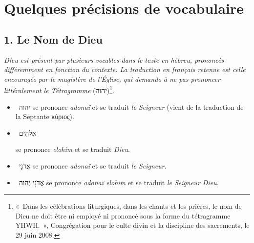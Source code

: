 \section*{Quelques précisions de vocabulaire}

\subsection*{1. Le Nom de Dieu}
\textit{Dieu est présent par plusieurs vocables dans le texte en hébreu, prononcés différemment en fonction du contexte. La traduction en français retenue est celle encouragée par le magistère de l'Église, qui demande à ne pas prononcer littéralement le Tétragramme} (\texthebrew{יהוה})\footnote{«~Dans les célébrations liturgiques, dans les chants et les prières, le nom de Dieu ne doit être ni employé ni prononcé sous la forme du tétragramme YHWH.~», Congrégation pour le culte divin et la discipline des sacrements, le 29 juin 2008.}.\par
\begin{itemize}[label=] 
\item ~\texthebrew{יהוה} se prononce \textit{adonaï} et se traduit \textit{le Seigneur} (vient de la traduction de la Septante \textgreek{κύριος}).
\item ~\texthebrew{אֱלֹהִים} \raggedright se prononce \textit{elohim} et se traduit \textit{Dieu}.
\item ~\texthebrew{אֲדֹנָי} se prononce \textit{adonaï} et se traduit \textit{le Seigneur}.
\item ~\texthebrew{אֲדֹנָי יְהוִה} se prononce \textit{adonaï elohim} et se traduit \textit{le Seigneur Dieu}.
\end{itemize}

